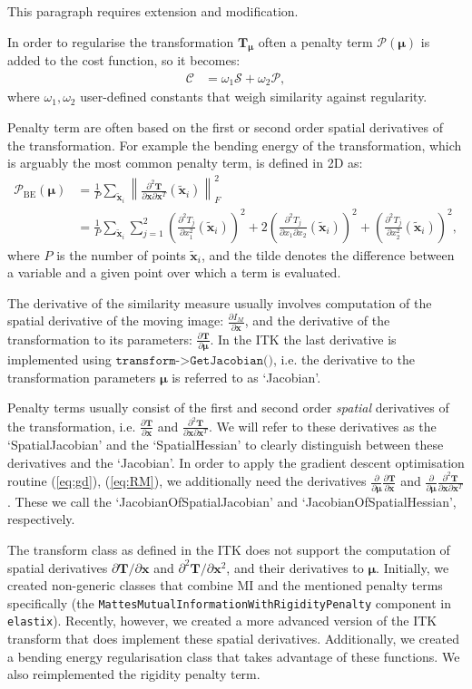 \documentclass[]{report}
\newcommand{\elastix}{\texttt{elastix}}
\newcommand{\vx}{\bm{x}}
\newcommand{\vxt}[1][]{\bm{\widetilde x}_{#1}}
\newcommand{\vmu}{\bm{\mu}}
\newcommand{\vT}{\bm{T}}
\newcommand{\D}[2]{\frac{\partial #1}{\partial #2}}
\newcommand{\Dd}[3]{\frac{\partial^2 #1}{\partial #2 \partial #3}}
\begin{document}
This paragraph requires extension and modification.

In order to regularise the transformation $\vT_{\vmu}$ often a
penalty term $\mathcal{P}(\vmu)$ is added to the cost function, so
it becomes:
\begin{align}
\mathcal{C} &= \omega_1 \mathcal{S} + \omega_2 \mathcal{P},
\end{align}
where $\omega_1, \omega_2$ user-defined constants that weigh
similarity against regularity.

Penalty term are often based on the first or second order spatial
derivatives of the transformation. For example the bending energy of
the transformation, which is arguably the most common penalty term,
is defined in 2D as:
\begin{align}
\mathcal{P}_{\mathrm{BE}}(\vmu) &= \frac{1}{P} \sum_{\vxt[i]}
\left\| \frac{\partial^2 \vT}{\partial \vx \partial \vx^T}(\vxt[i])
\right\|_F^2 \\
&= \frac{1}{P} \sum_{\vxt[i]} \sum_{j = 1}^2 \left( \frac{\partial^2
T_j}{\partial x_1^2}(\vxt[i]) \right)^2  + 2 \left( \frac{\partial^2
T_j}{\partial x_1 \partial x_2}(\vxt[i]) \right)^2 + \left(
\frac{\partial^2 T_j}{\partial x_2^2}(\vxt[i]) \right)^2,
\end{align}
where $P$ is the number of points $\vxt[i]$, and the tilde denotes
the difference between a variable and a given point over which a
term is evaluated.

The derivative of the similarity measure usually involves
computation of the spatial derivative of the moving image:
$\D{I_M}{\vx}$, and the derivative of the transformation to its
parameters: $\D{\vT}{\vmu}$. In the ITK the last derivative is
implemented using $\texttt{transform->GetJacobian()}$, i.e. the
derivative to the transformation parameters $\vmu$ is referred to as
`Jacobian'.

Penalty terms usually consist of the first and second order
\emph{spatial} derivatives of the transformation, i.e.
$\D{\vT}{\vx}$ and $\Dd{\vT}{\vx}{\vx^T}$. We will refer to these
derivatives as the `SpatialJacobian' and the `SpatialHessian' to
clearly distinguish between these derivatives and the `Jacobian'. In
order to apply the gradient descent optimisation routine
(\ref{eq:gd}), (\ref{eq:RM}), we additionally need the derivatives
$\D{}{\vmu} \D{\vT}{\vx}$ and $\D{}{\vmu} \Dd{\vT}{\vx}{\vx^T}$.
These we call the `JacobianOfSpatialJacobian' and
`JacobianOfSpatialHessian', respectively.

The transform class as defined in the ITK does not support the computation of
spatial derivatives $\partial \vT / \partial \vx$ and $\partial^2 \vT /
\partial \vx^2$, and their derivatives to $\vmu$. Initially, we created
non-generic classes that combine MI and the mentioned penalty terms
specifically (the \texttt{MattesMutualInformationWithRigidityPenalty} component
in \elastix). Recently, however, we created a more advanced version of the ITK
transform that does implement these spatial derivatives. Additionally, we
created a bending energy regularisation class that takes advantage of these
functions. We also reimplemented the rigidity penalty term.
\end{document}
